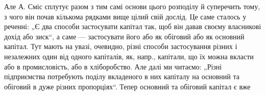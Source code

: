 Але А. Сміс сплутує разом з тим самі основи цього розподілу й суперечить
тому, з чого він почав кількома рядками вище цілий свій
дослід. Це саме сталось у реченні: „Є два способи застосувати капітал
так, щоб він давав своєму власникові дохід або зиск“, а саме — застосувати
його або як обіговий або як основний капітал. Тут мають на увазі,
очевидно, різні способи застосування різних і незалежних один від одного
капіталів, як, напр., капітали, що їх можна вкласти або в промисловість,
або в хліборобство. Але далі ми читаємо: „Різні підприємства
потребують поділу вкладеного в них капіталу на основний та обіговий
в дуже різних пропорціях“. Тепер основний та обіговий капітал є вже